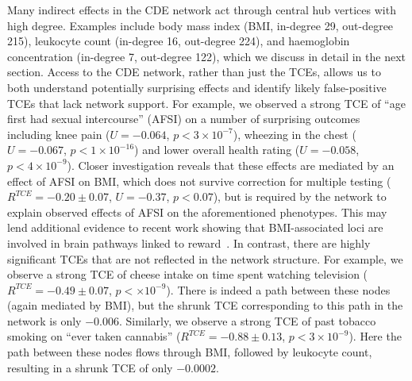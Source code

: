 \documentclass{article}
\begin{document}
Many indirect effects in the CDE network act through central hub vertices with high degree. Examples include body mass index (BMI, in-degree 29, out-degree 215), leukocyte count (in-degree 16, out-degree 224), and
haemoglobin concentration (in-degree 7, out-degree 122), which we discuss in detail in the next
section. Access to the CDE network, rather than just the TCEs, allows us to both understand potentially surprising effects and identify likely false-positive TCEs that lack network support.
For example, we observed a strong TCE of ``age first had sexual intercourse'' (AFSI) on a number
of surprising outcomes including knee pain ($U = -0.064$, $p < 3 \times 10^{-7}$),
wheezing in the chest ($U = -0.067$, $p < 1 \times 10^{-16}$) and
lower overall health rating ($U = -0.058$, $p < 4 \times 10^{-9}$). Closer investigation reveals
that these effects are mediated by an effect  of AFSI on BMI, which does not survive
correction for multiple testing ($R^{TCE} = -0.20 \pm 0.07$, $U = -0.37$, $p < 0.07$),
but is required by the network to explain observed effects of AFSI on the aforementioned phenotypes.
This may lend additional evidence to recent work showing that BMI-associated loci are involved
in brain pathways linked to reward~\cite{Ndiaye2020}.
In contrast, there are highly significant TCEs that are not reflected in
the network structure. For example, we observe a strong TCE of cheese intake on time spent watching television
($R^{TCE} = -0.49 \pm 0.07$, $p <  \times 10^{-9}$).
There is indeed a path between these nodes (again mediated by BMI), but the shrunk TCE corresponding
to this path in the network is only $-0.006$. Similarly, we observe a strong TCE of 
past tobacco smoking on ``ever taken cannabis'' ($R^{TCE} = -0.88 \pm 0.13$, $p < 3 \times 10^{-9}$).
Here the path between these nodes flows through BMI, followed by leukocyte count, resulting in a shrunk TCE of only $-0.0002$.
 
\end{document}
